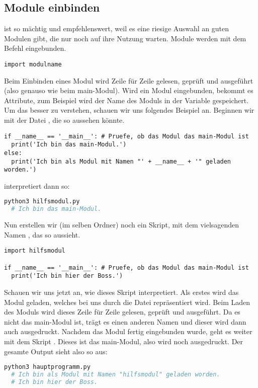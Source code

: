 \subsection{Module einbinden}
\label{section:module:module_einbinden}
\Python ist so mächtig und empfehlenswert, weil es eine riesige Auswahl an guten Modulen gibt, die nur noch auf ihre Nutzung warten.
Module werden mit dem Befehl  eingebunden.
\begin{lstlisting}
import modulname
\end{lstlisting}
Beim Einbinden eines Modul  wird  Zeile für Zeile gelesen, geprüft und ausgeführt (also genauso wie beim main-Modul).
Wird ein Modul eingebunden, bekommt es Attribute, zum Beispiel wird der Name des Moduls in der Variable  gespeichert.
Um das besser zu verstehen, schauen wir uns folgendes Beispiel an.
Beginnen wir mit der Datei , die so aussehen könnte.
\begin{lstlisting}
if __name__ == '__main__': # Pruefe, ob das Modul das main-Modul ist
  print('Ich bin das main-Modul.')
else:
  print('Ich bin als Modul mit Namen "' + __name__ + '" geladen worden.')
\end{lstlisting}
\PythonDrei interpretiert  dann so:
\begin{lstlisting}[language=bash]
python3 hilfsmodul.py
  # Ich bin das main-Modul.
\end{lstlisting}
Nun erstellen wir (im selben Ordner) noch ein \Python Skript, mit dem vielsagenden Namen , das so aussieht.
\begin{lstlisting}
import hilfsmodul

if __name__ == '__main__': # Pruefe, ob das Modul das main-Modul ist
  print('Ich bin hier der Boss.')
\end{lstlisting}
Schauen wir uns jetzt an, wie \Python dieses Skript interpretiert.
Als erstes wird das Modul  geladen, welches bei uns durch die Datei  repräsentiert wird.
Beim Laden des Moduls  wird dieses Zeile für Zeile gelesen, geprüft und ausgeführt.
Da es nicht das main-Modul ist, trägt es einen anderen Namen und dieser wird dann auch ausgedruckt.
Nachdem das Modul  fertig eingebunden wurde, geht es weiter mit dem Skript .
Dieses ist das main-Modul, also wird noch  ausgedruckt.
Der gesamte Output sieht also so aus:
\begin{lstlisting}[language=bash]
python3 hauptprogramm.py 
  # Ich bin als Modul mit Namen "hilfsmodul" geladen worden.
  # Ich bin hier der Boss.
\end{lstlisting}

